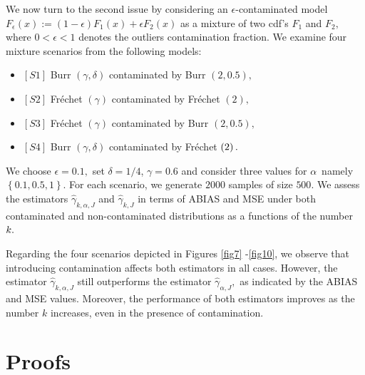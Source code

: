 \documentclass[12pt,reqno,openbib,runningheads,a4paper,portrait]{amsart}%
\begin{document}
\noindent We now turn to the second issue by considering an $\epsilon
$-contaminated model $F_{\epsilon}\left(  x\right)  :=\left(  1-\epsilon
\right)  F_{1}\left(  x\right)  +\epsilon F_{2}\left(  x\right)  $ as a
mixture of two cdf's $F_{1}$ and $F_{2},$ where $0<\epsilon<1$ denotes the
outliers contamination fraction. We examine four mixture scenarios from the
following models:\smallskip

\begin{itemize}
\item $\left[  S1\right]  $ Burr $\left(  \gamma,\delta\right)  $ contaminated
by Burr $\left(  2,0.5\right)  ,$

\item $\left[  S2\right]  $ Fr\'{e}chet $\left(  \gamma\right)  $ contaminated
by Fr\'{e}chet $\left(  2\right)  ,$

\item $\left[  S3\right]  $ Fr\'{e}chet $\left(  \gamma\right)  $ contaminated
by Burr $\left(  2,0.5\right)  ,$

\item $\left[  S4\right]  $ Burr $\left(  \gamma,\delta\right)  $ contaminated
by Fr\'{e}chet $\left(  2\right)  .\medskip$
\end{itemize}

\noindent We choose $\epsilon=0.1,$ set $\delta=1/4$, $\gamma=0.6$ and
consider three values for $\alpha$\ namely $\left\{  0.1,0.5,1\right\}  .$ For
each scenario, we generate $2000$ samples of size $500.$ We assess the
estimators $\widehat{\gamma}_{k,\alpha,J}$ and $\widehat{\gamma}_{k,J}$ in
terms of ABIAS and MSE under both contaminated and non-contaminated
distributions as a functions of the number $k.\medskip$

\noindent Regarding the four scenarios depicted in Figures \ref{fig7}%
-\ref{fig10}, we observe that introducing contamination affects both
estimators in all cases. However, the estimator $\widehat{\gamma}_{k,\alpha
,J}$ still outperforms the estimator $\widehat{\gamma}_{\alpha,J},$ as
indicated by the ABIAS and MSE values. Moreover, the performance of both
estimators improves as the number $k$ increases, even in the presence of contamination.

\section{\textbf{Proofs\label{sec6}}}
\end{document}
